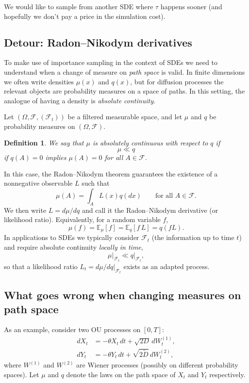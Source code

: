 \documentclass[11pt]{article}
\newtheorem{definition}{Definition}
\begin{document}
We would like to sample from another SDE where $\tau$ happens sooner (and hopefully we don't pay a price in the simulation cost). 

\subsection*{Detour: Radon--Nikodym derivatives}

To make use of importance sampling in the context of SDEs we need to understand when a change of measure on \emph{path space} is valid. In finite dimensions we often write densities $\mu(x)$ and $q(x)$, but for diffusion processes the relevant objects are probability measures on a space of paths. In this setting, the analogue of having a density is \emph{absolute continuity}.

Let $(\Omega,\mathcal F,(\mathcal F_t))$ be a filtered measurable space, and let $\mu$ and $q$ be probability measures on $(\Omega,\mathcal F)$. 
\begin{definition}
We say that $\mu$ is absolutely continuous with respect to $q$ if 
\begin{equation}
\mu \ll q
\end{equation}
if $q(A)=0$ implies $\mu(A)=0$ for all $A\in\mathcal F$. 
\end{definition}
In this case, the Radon--Nikodym theorem guarantees the existence of a nonnegative observable $L$ such that
\begin{equation}
\mu(A) = \int_A L(x)q(dx) \qquad \text{for all } A\in\mathcal F.
\end{equation}
We then write $L = d\mu/dq$ and call it the Radon--Nikodym derivative (or likelihood ratio). Equivalently, for a random variable $f$,
\begin{equation}
\mu(f) = {\mathbb E}_{\mu}[f] = {\mathbb E}_{q}[f\,L] = q(fL).
\end{equation}
In applications to SDEs we typically consider $\mathcal F_t$ (the information up to time $t$) and require absolute continuity \emph{locally in time},
\begin{equation}
\mu\big|_{\mathcal F_t} \ll q\big|_{\mathcal F_t},
\end{equation}
so that a likelihood ratio $L_t = d\mu/dq|_{\mathcal F_t}$ exists as an adapted process.

\subsection*{What goes wrong when changing measures on path space}
As an example, consider two OU processes on $[0,T]$:
\begin{align}
dX_t &= -\theta X_t\,dt +\sqrt{2D}\,dW_t^{(1)},\\
dY_t &= -\theta Y_t\,dt + \sqrt{2\tilde{D}}\,dW_t^{(2)},
\end{align}
where $W^{(1)}$ and $W^{(2)}$ are Wiener processes (possibly on different probability spaces). Let $\mu$ and $q$ denote the laws on the path space of $X_t$ and $Y_t$ respectively. 
\end{document}
